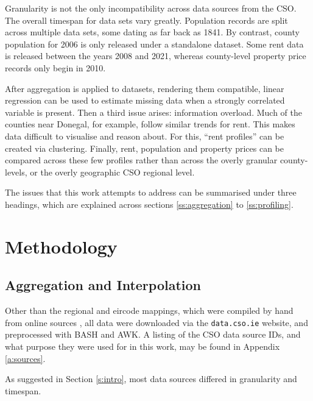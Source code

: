\documentclass[twocolumn]{article}
\begin{document}
Granularity is not the only incompatibility across data sources from the CSO.
The overall timespan for data sets vary greatly.  Population records are split
across multiple data sets, some dating as far back as 1841.  By contrast,
county population for 2006 is only released under a standalone dataset.  Some
rent data is released between the years 2008 and 2021, whereas county-level
property price records only begin in 2010.

After aggregation is applied to datasets, rendering them compatible, linear
regression can be used to estimate missing data when a strongly correlated
variable is present.  Then a third issue arises: information overload.  Much of
the counties near Donegal, for example, follow similar trends for rent.  This
makes data difficult to visualise and reason about.  For this, ``rent
profiles'' can be created via clustering.  Finally, rent, population and
property prices can be compared across these few profiles rather than across
the overly granular county-levels, or the overly geographic CSO regional
level.

The issues that this work attempts to address can be summarised under three headings,
which are explained across sections \ref{ss:aggregation} to
\ref{ss:profiling}.

\section{Methodology}
\subsection{Aggregation and Interpolation\label{ss:aggregation}}
Other than the regional and eircode mappings, which were compiled by hand from
online sources \cite{eircode19, cso_regions}, all data were downloaded via the
{\tt data.cso.ie} website, and preprocessed with BASH and AWK.  A listing of
the CSO data source IDs, and what purpose they were used for in this work, may
be found in Appendix \ref{a:sources}.

As suggested in Section \ref{s:intro}, most data sources differed in granularity
and timespan. \\
\end{document}
